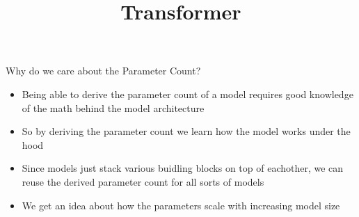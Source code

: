 



\usepackage{tikz}
\usetikzlibrary{positioning}


\newcommand{\titlefigure}{}
\newcommand{\learninggoals}{
\item Understand which components of the Transformer contribute to the parameter count
\item Learn how to calculate the total number of the model parameters}

\title{Transformer}
\date{}



\begin{frame}{Why do we care about the Parameter Count?}
\begin{itemize}
    \item Being able to derive the parameter count of a model requires good knowledge of the math behind the model architecture
    \item So by deriving the parameter count we learn how the model works under the hood
    \item Since models just stack various buidling blocks on top of eachother, we can reuse the derived parameter count for all sorts of models
    \item We get an idea about how the parameters scale with increasing model size
\end{itemize}
\end{frame}


